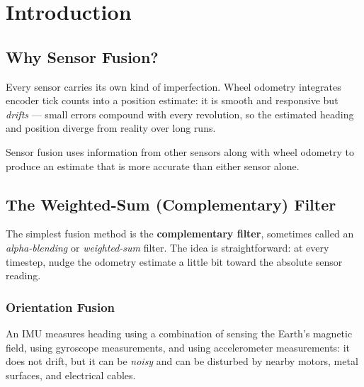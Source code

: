 \documentclass[12pt,letterpaper]{article}
\begin{document}

\newpage

\section{Introduction}

\subsection{Why Sensor Fusion?}

Every sensor carries its own kind of imperfection.
Wheel odometry integrates encoder tick counts into a position estimate: it is
smooth and responsive but \emph{drifts} --- small errors compound with every
revolution, so the estimated heading and position diverge from reality over
long runs.

Sensor fusion uses information from other sensors along with wheel odometry to produce an estimate that is
more accurate than either sensor alone.

\subsection{The Weighted-Sum (Complementary) Filter}

The simplest fusion method is the \textbf{complementary filter}, sometimes
called an \textit{alpha-blending} or \textit{weighted-sum} filter.
The idea is straightforward: at every timestep, nudge the odometry estimate a
little bit toward the absolute sensor reading.

\subsubsection*{Orientation Fusion}
An IMU measures  heading using a combination of sensing the Earth's magnetic field, using gyroscope measurements, and using accelerometer measurements:
it does not drift, but it can be \emph{noisy} and can be disturbed by nearby
motors, metal surfaces, and electrical cables.
\end{document}
